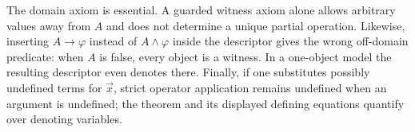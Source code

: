 The domain axiom is essential. A guarded witness axiom alone allows
arbitrary values away from $A$ and does not determine a unique partial
operation. Likewise, inserting $A\to\varphi$ instead of
$A\land\varphi$ inside the descriptor gives the wrong off-domain
predicate: when $A$ is false, every object is a witness. In a one-object
model the resulting descriptor even denotes there. Finally, if one
substitutes possibly undefined terms for $\vec x$, strict operator
application remains undefined when an argument is undefined; the theorem
and its displayed defining equations quantify over denoting variables.


\pagebreak




%


